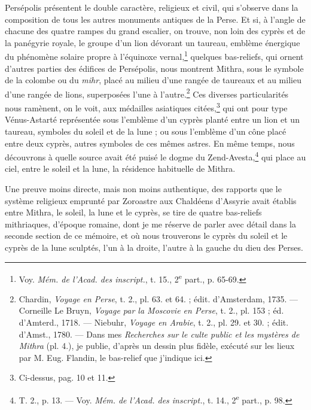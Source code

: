 \documentclass[a4paper, 11pt, oneside, polutonikogreek, french]{article}
\begin{document}
Persépolis présentent le double caractère, religieux et civil, qui s'observe dans la composition de tous les autres monuments antiques de la Perse. Et si, à l'angle de chacune des quatre rampes du grand escalier, on trouve, non loin des cyprès et de la panégyrie royale, le groupe d'un lion dévorant un taureau, emblème énergique du phénomène solaire propre à l'équinoxe vernal,\footnote{Voy. \emph{Mém. de l'Acad. des inscript.}, t. 15., 2\textsuperscript{e} part., p. 65-69.} quelques bas-reliefs, qui ornent d'autres parties des édifices de Persépolis, nous montrent Mithra, sous le symbole de la colombe ou du \emph{mihr}, placé au milieu d'une rangée de taureaux et au milieu d'une rangée de lions, superposées l'une à l'autre.\footnote{Chardin, \emph{Voyage en Perse}, t. 2., pl. 63. et 64. ; édit. d'Amsterdam, 1735. --- Corneille Le Bruyn, \emph{Voyage par la Moscovie en Perse}, t. 2., pl. 153 ; éd. d'Amterd., 1718. --- Niebuhr, \emph{Voyage en Arabie}, t. 2., pl. 29. et 30. ; édit. d'Amst., 1780. --- Dans mes \emph{Recherches sur le culte public et les mystères de Mithra} (pl. 4.), je publie, d'après un dessin plus fidèle, exécuté sur les lieux par M. Eug. Flandin, le bas-relief que j'indique ici.} Ces diverses particularités nous ramènent, on le voit, aux médailles asiatiques citées,\footnote{Ci-dessus, pag. 10 et 11.} qui ont pour type Vénus-Astarté représentée sous l'emblème d'un cyprès planté entre un lion et un taureau, symboles du soleil et de la lune ; ou sous l'emblème d'un cône placé entre deux cyprès, autres symboles de ces mêmes astres. En même temps, nous découvrons à quelle source avait été puisé le dogme du Zend-Avesta,\footnote{T. 2., p. 13. --- Voy. \emph{Mém. de l'Acad. des inscript.}, t. 14., 2\textsuperscript{e} part., p. 98.} qui place au ciel, entre le soleil et la lune, la résidence habituelle de Mithra.

Une preuve moins directe, mais non moins authentique, des rapports que le système religieux emprunté par Zoroastre aux Chaldéens d'Assyrie avait établis entre Mithra, le soleil, la lune et le cyprès, se tire de quatre bas-reliefs mithriaques, d'époque romaine, dont je me réserve de parler avec détail dans la seconde section de ce mémoire, et où nous trouverons le cyprès du soleil et le cyprès de la lune sculptés, l'un à la droite, l'autre à la gauche du dieu des Perses.
\end{document}
